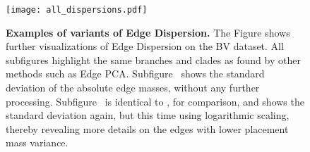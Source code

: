 
\begin{figure}[!htpb]
    \centering
    \texttt{[image: all\_dispersions.pdf]}
    \begin{subfigure}{0pt}
        \label{fig:all_dispersions:sub:em_var}
    \end{subfigure}
    \begin{subfigure}{0pt}
        \label{fig:all_dispersions:sub:em_varc}
    \end{subfigure}
    \begin{subfigure}{0pt}
        \label{fig:all_dispersions:sub:em_iod}
    \end{subfigure}
    \begin{subfigure}{0pt}
        \label{fig:all_dispersions:sub:ei_var}
    \end{subfigure}
    \caption[Examples of variants of Edge Dispersion]{
        \textbf{Examples of variants of Edge Dispersion.}
        The Figure shows further visualizations of Edge Dispersion on the \ac{BV} dataset.
        All subfigures highlight the same branches and clades as found by other methods such as Edge PCA.
        Subfigure~
        shows the standard deviation of the absolute edge masses, without any further processing.
        Subfigure~
        is identical to , for comparison,
        and shows the standard deviation again, but this time using logarithmic scaling,
        thereby revealing more details on the edges with lower placement mass variance.
}
\end{figure}
